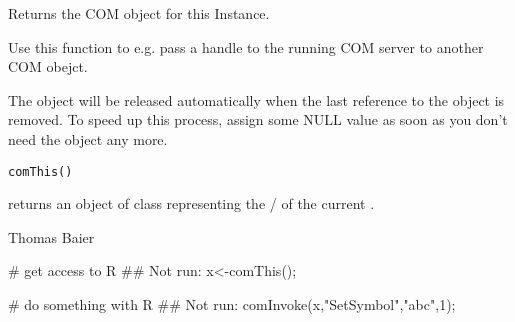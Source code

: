 \begin{Description}\relax
Returns the COM object for this \R{} Instance.

Use this function to e.g. pass a handle to the running \R{} COM server to
another COM obejct.

The object will be released automatically when the last reference to the
object is removed. To speed up this process, assign some NULL value as soon
as you don't need the object any more.
\end{Description}
\begin{Usage}
\begin{verbatim}
comThis()
\end{verbatim}
\end{Usage}
\begin{Arguments}
\end{Arguments}
\begin{Value}
 returns an object of class  representing
the / of the current \R.
\end{Value}
\begin{Author}\relax
Thomas Baier
\end{Author}
\begin{Examples}
\begin{ExampleCode}
# get access to R
## Not run: x<-comThis();

# do something with R
## Not run: comInvoke(x,"SetSymbol","abc",1);
\end{ExampleCode}
\end{Examples}

